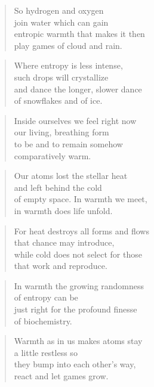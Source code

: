 \documentclass[10pt,a4paper]{article}
\begin{document}
\begin{multicols}{2}
\begin{verse}
So hydrogen and oxygen\\
join water which can gain\\
entropic warmth that makes it then\\
play games of cloud and rain.
\end{verse}

\begin{verse}
Where entropy is less intense,\\
such drops will crystallize\\
and dance the longer, slower dance\\
of snowflakes and of ice.
\end{verse}

\begin{verse}
Inside ourselves we feel right now\\
our living, breathing form\\
to be and to remain somehow\\
comparatively warm.
\end{verse}

\begin{verse}
Our atoms lost the stellar heat\\
and left behind the cold\\
of empty space. In warmth we meet,\\
in warmth does life unfold.
\end{verse}

\begin{verse}
For heat destroys all forms and flows\\
that chance may introduce,\\
while cold does not select for those\\
that work and reproduce.
\end{verse}

\begin{verse}
In warmth the growing randomness\\
of entropy can be\\
just right for the profound finesse\\
of biochemistry.
\end{verse}

\begin{verse}
Warmth as in us makes atoms stay\\
a little restless so\\
they bump into each other’s way,\\
react and let games grow.
\end{verse}


\end{multicols}
\end{document}
